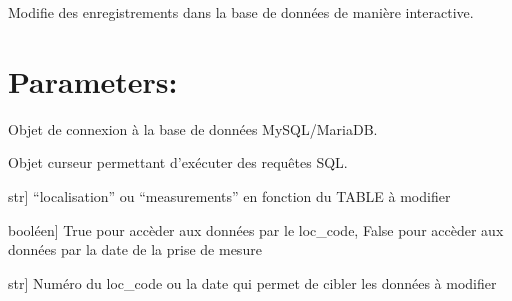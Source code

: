\documentclass[letterpaper,10pt,french]{sphinxmanual}
\begin{document}
\begin{fulllineitems}
\label{\detokenize{library:lib_sql.modify_database_records}}
\pysigstartsignatures
\pysiglinewithargsret
{}
{\sphinxparamcomma {}\sphinxparamcomma {}\sphinxparamcomma {}\sphinxparamcomma {}}
{}
\pysigstopsignatures
\sphinxAtStartPar
Modifie des enregistrements dans la base de données de manière interactive.


\section{Parameters:}
\label{\detokenize{library:parameters}}\begin{description}
\sphinxAtStartPar
Objet de connexion à la base de données MySQL/MariaDB.

\sphinxAtStartPar
Objet curseur permettant d’exécuter des requêtes SQL.

\sphinxlineitem{data\_type}{[}str{]}
\sphinxAtStartPar
“localisation” ou “measurements” en fonction du TABLE à modifier

\sphinxlineitem{by\_code}{[}booléen{]}
\sphinxAtStartPar
True pour accèder aux données par le loc\_code, False pour accèder aux données par la date de la prise de mesure

\sphinxlineitem{search\_value}{[}str{]}
\sphinxAtStartPar
Numéro du loc\_code ou la date qui permet de cibler les données à modifier

\end{description}

\end{fulllineitems}



\renewcommand{\indexname}{Index des modules Python}
\begin{sphinxtheindex}
\let\bigletter\sphinxstyleindexlettergroup
\bigletter{l}
\item\relax{}
\end{sphinxtheindex}

\renewcommand{\indexname}{Index}
\printindex
\end{document}
